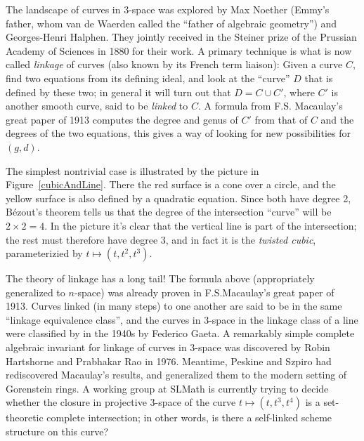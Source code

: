 \documentclass[11pt, oneside]{article}   	%
\begin{document}
The landscape of curves in 3-space was explored by 
Max Noether (Emmy's father, whom van de Waerden called the ``father of algebraic geometry'') and Georges-Henri Halphen. They jointly received in the Steiner prize of the Prussian Academy of Sciences in 1880 for their work. A primary technique is what is now called \emph{linkage} of curves (also known by its French term liaison):  Given a curve $C$, find two equations from its defining ideal, and look at the ``curve'' $D$ that is defined by these two; in general it will turn out that $D = C\cup C'$, where $C'$ is another smooth curve, said to be \emph{linked} to $C$. A formula from F.S. Macaulay's great paper
of 1913 computes the degree and genus
of $C'$ from that of $C$ and the degrees of the two equations, this gives a way of looking for
new possibilities for $(g,d)$.

The simplest nontrivial case is illustrated by the picture in
Figure~\ref{cubicAndLine}. There the red surface is a cone over a circle, and the yellow surface
is also defined by a quadratic equation. Since both have degree 2, B\'ezout's theorem tells us that the
degree of the intersection ``curve'' will be $2\times 2 = 4$. In the picture it's clear that the vertical line
is part of the intersection; the rest must therefore have degree 3, and in fact it is the \emph{twisted cubic},
parameterizied by $t\mapsto (t, t^{2}, t^{3})$.


The theory of linkage has a long tail! The formula above (appropriately generalized to $n$-space) was already proven in F.S.Macaulay's great paper of 1913. Curves linked (in many steps) to one another are said to be in the same ``linkage equivalence class'', and the curves in 3-space in the linkage class of a line were classified by in the 1940s by Federico Gaeta. A remarkably simple complete algebraic invariant for linkage of curves in 3-space was discovered by Robin Hartshorne and Prabhakar Rao in 1976. 
Meantime, Peskine and Szpiro had rediscovered Macaulay's results, and generalized them to the 
modern setting of Gorenstein rings. A working group at SLMath is currently trying to
decide whether the closure in projective 3-space of the curve $t \mapsto (t, t^{3}, t^{4})$ is a set-theoretic complete intersection; in other words, is there a self-linked scheme structure on this curve?
\end{document}
